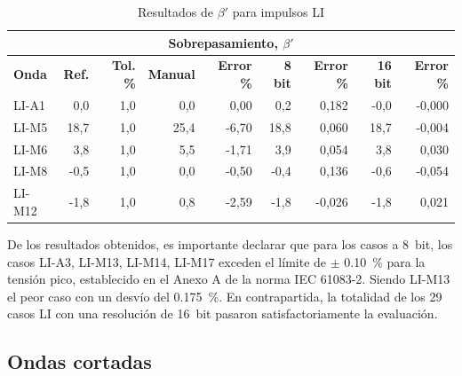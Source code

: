 \vspace{3\baselineskip}
\begin{table}[H]
    \centering
    \begin{tabular}{@{}lrrrrrrrr@{}}
        \toprule
        \multicolumn{9}{c}{\textbf{Sobrepasamiento, $\beta'$}}                                                                                                                \\ \midrule
        \textbf{Onda} & \textbf{Ref.} & \textbf{Tol. \%} & \textbf{Manual} & \textbf{Error \%} & \textbf{8 bit} & \textbf{Error \%} & \textbf{16 bit} & \textbf{Error \%} \\ \midrule
        LI-A1         & 0,0           & 1,0              & 0,0             & 0,00              & 0,2            & 0,182             & -0,0            & -0,000            \\ \midrule
        LI-M5         & 18,7          & 1,0              & 25,4            & -6,70             & 18,8           & 0,060             & 18,7            & -0,004            \\ \midrule
        LI-M6         & 3,8           & 1,0              & 5,5             & -1,71             & 3,9            & 0,054             & 3,8             & 0,030             \\ \midrule
        LI-M8         & -0,5          & 1,0              & 0,0             & -0,50             & -0,4           & 0,136             & -0,6            & -0,054            \\ \midrule
        LI-M12        & -1,8          & 1,0              & 0,8             & -2,59             & -1,8           & -0,026            & -1,8            & 0,021             \\ \bottomrule
    \end{tabular}
    \caption{Resultados de $\beta'$ para impulsos LI}
    \label{tab:resultados_os_li}
\end{table}
\vspace{3\baselineskip}

De los resultados obtenidos, es importante declarar que para los casos a \qty{8}{bit}, los casos LI-A3, LI-M13, LI-M14, LI-M17 exceden el límite de $\pm$ \qty{0,10}{\percent} para la tensión pico, establecido en el Anexo A de la norma IEC 61083-2. Siendo LI-M13 el peor caso con un desvío del \qty{0,175}{\percent}.
En contrapartida, la totalidad de los \num{29} casos LI con una resolución de \qty{16}{bit} pasaron satisfactoriamente la evaluación.

\subsection*{Ondas cortadas}
\label{subsec:precision_onda_cortada}

